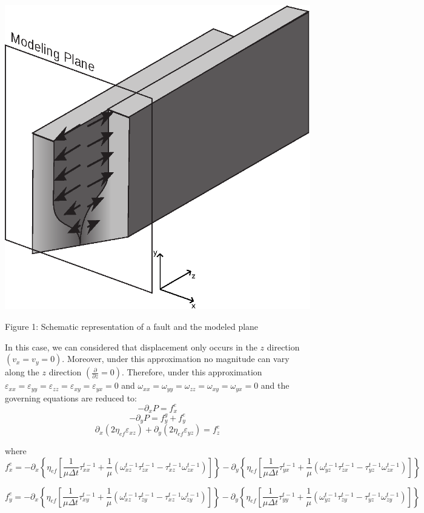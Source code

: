 \begin{DoxyImage}
\includegraphics{aps}
\caption{Figure 1\-: Schematic representation of a fault and the modeled plane}
\end{DoxyImage}
 In this case, we can considered that displacement only occurs in the $z$ direction $(v_{x}=v_{y}=0)$. Moreover, under this approximation no magnitude can vary along the $z$ direction $(\frac{\partial}{\partial z}=0)$. Therefore, under this approximation $\varepsilon_{xx}=\varepsilon_{yy}=\varepsilon_{zz}=\varepsilon_{xy}=\varepsilon_{yx}=0$ and $\omega_{xx}=\omega_{yy}=\omega_{zz}=\omega_{xy}=\omega_{yx}=0$ and the governing equations are reduced to\-: \[-\partial_x P = f^e_x \] \[-\partial_y P = f^g_y + f^e_y \] \[\partial_x(2\eta_{ef}\varepsilon_{xz})+\partial_y(2\eta_{ef}\varepsilon_{yz})=f^e_z\]

where \[f^e_x = -\partial_x \left\{\eta_{ef}\left[ \frac{1}{\mu\Delta t} \tau^{t-1}_{xx} + \frac{1}{\mu} \left(\omega^{t-1}_{xz}\tau^{t-1}_{zx} - \tau^{t-1}_{xz}\omega^{t-1}_{zx} \right) \right] \right\} -\partial_y \left\{\eta_{ef}\left[ \frac{1}{\mu\Delta t} \tau^{t-1}_{yx} + \frac{1}{\mu} \left(\omega^{t-1}_{yz}\tau^{t-1}_{zx} - \tau^{t-1}_{yz}\omega^{t-1}_{zx} \right) \right] \right\} \]

\[f^e_y = -\partial_x \left\{\eta_{ef}\left[ \frac{1}{\mu\Delta t} \tau^{t-1}_{xy} + \frac{1}{\mu} \left(\omega^{t-1}_{xz}\tau^{t-1}_{zy} - \tau^{t-1}_{xz}\omega^{t-1}_{zy} \right) \right] \right\} -\partial_y \left\{\eta_{ef}\left[ \frac{1}{\mu\Delta t} \tau^{t-1}_{yy} + \frac{1}{\mu} \left(\omega^{t-1}_{yz}\tau^{t-1}_{zy} - \tau^{t-1}_{yz}\omega^{t-1}_{zy} \right) \right] \right\} \]

